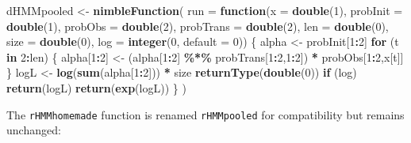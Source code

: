 \documentclass[
  12pt,
]{krantz}
\newenvironment{Shaded}{\begin{snugshade}}{\end{snugshade}}
\newcommand{\AttributeTok}[1]{\textcolor[rgb]{0.13,0.29,0.53}{#1}}
\newcommand{\ControlFlowTok}[1]{\textcolor[rgb]{0.13,0.29,0.53}{\textbf{#1}}}
\newcommand{\DecValTok}[1]{\textcolor[rgb]{0.00,0.00,0.81}{#1}}
\newcommand{\FunctionTok}[1]{\textcolor[rgb]{0.13,0.29,0.53}{\textbf{#1}}}
\newcommand{\NormalTok}[1]{#1}
\newcommand{\OtherTok}[1]{\textcolor[rgb]{0.56,0.35,0.01}{#1}}
\newcommand{\SpecialCharTok}[1]{\textcolor[rgb]{0.81,0.36,0.00}{\textbf{#1}}}
\begin{document}
\begin{Shaded}
\begin{Highlighting}[]
\NormalTok{dHMMpooled }\OtherTok{\textless{}{-}} \FunctionTok{nimbleFunction}\NormalTok{(}
  \AttributeTok{run =} \ControlFlowTok{function}\NormalTok{(}\AttributeTok{x =} \FunctionTok{double}\NormalTok{(}\DecValTok{1}\NormalTok{), }
                 \AttributeTok{probInit =} \FunctionTok{double}\NormalTok{(}\DecValTok{1}\NormalTok{),}
                 \AttributeTok{probObs =} \FunctionTok{double}\NormalTok{(}\DecValTok{2}\NormalTok{),}
                 \AttributeTok{probTrans =} \FunctionTok{double}\NormalTok{(}\DecValTok{2}\NormalTok{),}
                 \AttributeTok{len =} \FunctionTok{double}\NormalTok{(}\DecValTok{0}\NormalTok{),}
                 \AttributeTok{size =} \FunctionTok{double}\NormalTok{(}\DecValTok{0}\NormalTok{),}
                 \AttributeTok{log =} \FunctionTok{integer}\NormalTok{(}\DecValTok{0}\NormalTok{, }\AttributeTok{default =} \DecValTok{0}\NormalTok{)) \{}
\NormalTok{    alpha }\OtherTok{\textless{}{-}}\NormalTok{ probInit[}\DecValTok{1}\SpecialCharTok{:}\DecValTok{2}\NormalTok{]}
    \ControlFlowTok{for}\NormalTok{ (t }\ControlFlowTok{in} \DecValTok{2}\SpecialCharTok{:}\NormalTok{len) \{}
\NormalTok{      alpha[}\DecValTok{1}\SpecialCharTok{:}\DecValTok{2}\NormalTok{] }\OtherTok{\textless{}{-}}\NormalTok{ (alpha[}\DecValTok{1}\SpecialCharTok{:}\DecValTok{2}\NormalTok{] }\SpecialCharTok{\%*\%}\NormalTok{ probTrans[}\DecValTok{1}\SpecialCharTok{:}\DecValTok{2}\NormalTok{,}\DecValTok{1}\SpecialCharTok{:}\DecValTok{2}\NormalTok{]) }\SpecialCharTok{*}\NormalTok{ probObs[}\DecValTok{1}\SpecialCharTok{:}\DecValTok{2}\NormalTok{,x[t]]}
\NormalTok{    \}}
\NormalTok{    logL }\OtherTok{\textless{}{-}} \FunctionTok{log}\NormalTok{(}\FunctionTok{sum}\NormalTok{(alpha[}\DecValTok{1}\SpecialCharTok{:}\DecValTok{2}\NormalTok{])) }\SpecialCharTok{*}\NormalTok{ size}
    \FunctionTok{returnType}\NormalTok{(}\FunctionTok{double}\NormalTok{(}\DecValTok{0}\NormalTok{))}
    \ControlFlowTok{if}\NormalTok{ (log) }\FunctionTok{return}\NormalTok{(logL)}
    \FunctionTok{return}\NormalTok{(}\FunctionTok{exp}\NormalTok{(logL))}
\NormalTok{  \}}
\NormalTok{)}
\end{Highlighting}
\end{Shaded}

The \texttt{rHMMhomemade} function is renamed \texttt{rHMMpooled} for compatibility but remains unchanged:
\end{document}
